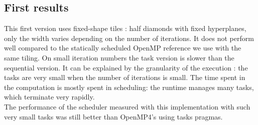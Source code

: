 \documentclass[a4paper,11pt]{article}
\begin{document}
\subsection{First results}

This first version uses fixed-shape tiles : half diamonds with fixed hyperplanes, only the
width varies depending on the number of iterations. It does not perform well compared to
the statically scheduled OpenMP reference we use with the same tiling. On small iteration
numbers the task version is slower than the sequential version. It can be explained by the
granularity of the execution : the tasks are very small when the number of iterations is small.
The time spent in the computation is mostly spent in scheduling: the runtime manages many tasks,
which terminate very rapidly. \\
The performance of the scheduler measured with this implementation with such very small
tasks was still better than OpenMP4’s using tasks pragmas.
\end{document}
